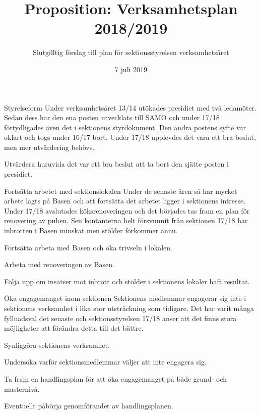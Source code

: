 \documentclass{dTeX-base}
\title{Proposition: Verksamhetsplan 2018/2019}
\subtitle{Slutgilltig förslag till plan för sektionsstyrelsen verksamhetsåret}
\author{}
\date{7 juli 2019}
\begin{document}
  \pagestyle{DTek}
  \maketitle

  \begin{FokusPunkt}{Styrelseform}{%
    Under verksamhetsåret 13/14 utökades presidiet med två ledamöter. Sedan
    dess har den ena posten utvecklats till SAMO och under 17/18 förtydligades
    även det i sektionens styrdokument. Den andra postens syfte var oklart och
    togs under 16/17 bort. Under 17/18 upplevdes det vara ett bra beslut, men
    mer utvärdering behövs.
  }
    \item Utvärdera huruvida det var ett bra beslut att ta bort den sjätte
      posten i presidiet.
  \end{FokusPunkt}

  \begin{FokusPunkt}{Fortsätta arbetet med sektionslokalen}{
    Under de senaste åren så har mycket arbete lagts på Basen och att fortsätta
    det arbetet ligger i sektionens intresse. Under 17/18 avslutades
    köksrenoveringen och det börjades tas fram en plan för renovering av puben.
    Sen kontanterna helt försvunnit från sektionen 17/18 har inbrotten i Basen
    minskat men stölder förkommer ännu.
  }
    \item Fortsätta arbeta med Basen och öka trivseln i lokalen.
    \item Arbeta med renoveringen av Basen.
    \item Följa upp om insatser mot inbrott och stölder i sektionens lokaler
      haft resultat.
  \end{FokusPunkt}

  \begin{FokusPunkt}{Öka engagemanget inom sektionen}{
    Sektionens medlemmar engagerar sig inte i sektionens verksamhet i lika stor
    utsträckning som tidigare. Det har varit många fyllnadsval det senaste och
    sektionsstyrelsen 17/18 anser att det finns stora möjligheter att förändra
    detta till det bättre.
  }
    \item Synliggöra sektionens verksamhet.
    \item Undersöka varför sektionsmedlemmar väljer att inte engagera sig.
    \item Ta fram en handlingsplan för att öka engagemanget på både grund- och
      masternivå.
    \item Eventuellt påbörja genomförandet av handlingsplanen.
  \end{FokusPunkt}
\end{document}

